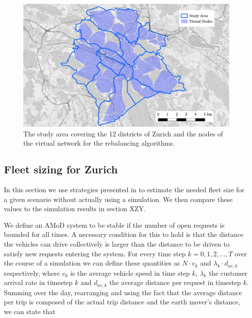 \begin{figure}[h]
\begin{center}\includegraphics[width=1.0\textwidth]{figures/map.pdf}\end{center}
\caption{The study area covering the 12 districts of Zurich and the nodes of the virtual network for the rebalancing algorithms.}
\label{fig:study_area_vnodes}
\end{figure}

\subsection{Fleet sizing for Zurich}
\label{subsec:fleetSizing}

In this section we use strategies presented in \cite{spieser2014toward} to estimate the needed fleet size for a given scenario without actually using a simulation. We then compare these values to the simulation results in section XZY.

We define an AMoD system to be stable if the number of open requests is bounded for all times. A necessary condition for this to hold is that the distance the vehicles can drive collectively is larger than the distance to be driven to satisfy new requests entering the system. For every time step $k = 0,1,2,...,T$ over the course of a simulation we can define these quantities as $N \cdot v_k$ and $ \lambda_k \cdot d_{av,k}$ respectively, where $v_k$ is the average vehicle speed in time step $k$, $\lambda_k$ the customer arrival rate in timestep $k$ and $d_{av,k}$ the average distance per request in timestep $k$. Summing over the day, rearranging and using the fact that the average distance per trip is composed of the actual trip distance and the earth mover's distance, we can state that

